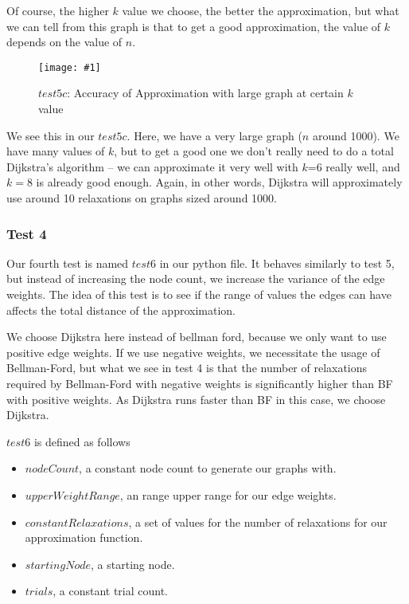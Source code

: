 \documentclass{article}
\newcommand{\figureInsetScaled}[3]
{
    \FloatBarrier{}
    \begin{figure}[ht!]
        \centering
        \texttt{[image: \#1]}
        \caption{#2}
    \end{figure}
    \FloatBarrier{}
}
\begin{document}
Of course, the higher $k$ value we choose, the better the approximation, but what we can tell from this graph is that to get a good approximation, the value of $k$ depends on the value of $n$.

\FloatBarrier{}
\figureInsetScaled{images/part1/exp1_5c.png}{$test5c$: Accuracy of Approximation with large graph at certain $k$ value}{.5}
\FloatBarrier{}

We see this in our $test5c$. Here, we have a very large graph ($n$ around 1000). We have many values of $k$, but to get a good one we don't really need to do a total Dijkstra's algorithm -- we can approximate it very well with $k$=6 really well, and $k=8$ is already good enough. Again, in other words, Dijkstra will approximately use around 10 relaxations on graphs sized around 1000.

\newpage
\subsubsection{Test 4}

Our fourth test is named $test6$ in our python file. It behaves similarly to test 5, but instead of increasing the node count, we increase the variance of the edge weights. The idea of this test is to see if the range of values the edges can have affects the total distance of the approximation.

We choose Dijkstra here instead of bellman ford, because we only want to use positive edge weights. If we use negative weights, we necessitate the usage of Bellman-Ford, but what we see in test 4 is that the number of relaxations required by Bellman-Ford with negative weights is significantly higher than BF with positive weights. As Dijkstra runs faster than BF in this case, we choose Dijkstra.

$test6$ is defined as follows
\begin{itemize}
 \item $nodeCount$, a constant node count to generate our graphs with.
 \item $upperWeightRange$, an range upper range for our edge weights.
 \item $constantRelaxations$, a set of values for the number of relaxations for our approximation function.
 \item $startingNode$, a starting node.
 \item $trials$, a constant trial count.
\end{itemize}
\end{document}
